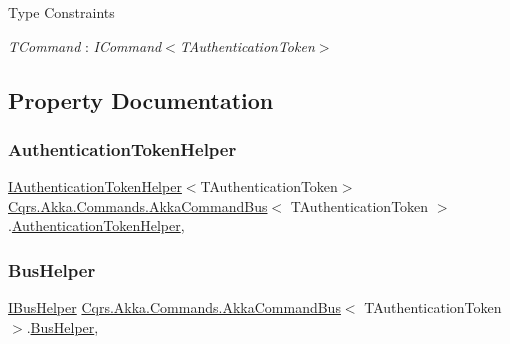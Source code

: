 \begin{Desc}
\item[Type Constraints]\begin{description}
\item[{\em T\+Command} : {\em I\+Command$<$T\+Authentication\+Token$>$}]\end{description}
\end{Desc}


\subsection{Property Documentation}
\mbox{\label{classCqrs_1_1Akka_1_1Commands_1_1AkkaCommandBus_ad74a628484d215ec6daab02b20ac1dbe}} 
\subsubsection{\texorpdfstring{Authentication\+Token\+Helper}{AuthenticationTokenHelper}}
{\footnotesize\ttfamily \hyperlink{interfaceCqrs_1_1Authentication_1_1IAuthenticationTokenHelper}{I\+Authentication\+Token\+Helper}$<$T\+Authentication\+Token$>$ \hyperlink{classCqrs_1_1Akka_1_1Commands_1_1AkkaCommandBus}{Cqrs.\+Akka.\+Commands.\+Akka\+Command\+Bus}$<$ T\+Authentication\+Token $>$.\hyperlink{classCqrs_1_1Authentication_1_1AuthenticationTokenHelper}{Authentication\+Token\+Helper}\hspace{0.3cm}{\ttfamily [get]}, {\ttfamily [protected]}}

\mbox{\label{classCqrs_1_1Akka_1_1Commands_1_1AkkaCommandBus_abe5501970c0e39abb9a70670ab985fdc}} 
\subsubsection{\texorpdfstring{Bus\+Helper}{BusHelper}}
{\footnotesize\ttfamily \hyperlink{interfaceCqrs_1_1Bus_1_1IBusHelper}{I\+Bus\+Helper} \hyperlink{classCqrs_1_1Akka_1_1Commands_1_1AkkaCommandBus}{Cqrs.\+Akka.\+Commands.\+Akka\+Command\+Bus}$<$ T\+Authentication\+Token $>$.\hyperlink{classCqrs_1_1Bus_1_1BusHelper}{Bus\+Helper}\hspace{0.3cm}{\ttfamily [get]}, {\ttfamily [protected]}}

